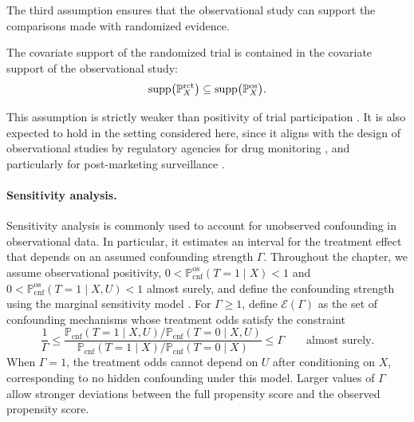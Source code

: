 The third assumption ensures that the observational study can support the comparisons made with randomized evidence.

\begin{assumption}
\label{asm:confounding-support-inclusion}
The covariate support of the randomized trial is contained in the covariate support of the observational study:
\[
  \operatorname{supp}\bigl(\mathbb{P}^{\mathrm{rct}}_X\bigr)
  \subseteq
  \operatorname{supp}\bigl(\mathbb{P}^{\mathrm{os}}_X\bigr).
\]
\end{assumption}

This assumption is strictly weaker than positivity of trial participation \citep{stuart2011use,hartman2015sample,andrews2017weighting,nie2021covariate,colnet2022reweighting}. It is also expected to hold in the setting considered here, since it aligns with the design of observational studies by regulatory agencies for drug monitoring \citep{he2020clinical}, and particularly for post-marketing surveillance \citep{franklin2019evaluating,schurman2019framework}.

\paragraph{Sensitivity analysis.}
Sensitivity analysis is commonly used to account for unobserved confounding in observational data. In particular, it estimates an interval for the treatment effect that depends on an assumed confounding strength \(\Gamma\). Throughout the chapter, we assume observational positivity, \(0 < \mathbb{P}^{\mathrm{os}}_{\mathrm{cnf}}(T=1\mid X) < 1\) and \(0 < \mathbb{P}^{\mathrm{os}}_{\mathrm{cnf}}(T=1\mid X,U) < 1\) almost surely, and define the confounding strength using the marginal sensitivity model \citep{tan2006distributional}. For \(\Gamma \geq 1\), define \(\mathcal{E}(\Gamma)\) as the set of confounding mechanisms whose treatment odds satisfy the constraint
\[
  \frac{1}{\Gamma}
  \leq
  \frac{
    \mathbb{P}_{\mathrm{cnf}}(T=1\mid X,U)/
    \mathbb{P}_{\mathrm{cnf}}(T=0\mid X,U)
  }{
    \mathbb{P}_{\mathrm{cnf}}(T=1\mid X)/
    \mathbb{P}_{\mathrm{cnf}}(T=0\mid X)
  }
  \leq
  \Gamma
  \qquad\text{almost surely.}
\]
When \(\Gamma=1\), the treatment odds cannot depend on \(U\) after conditioning on \(X\), corresponding to no hidden confounding under this model. Larger values of \(\Gamma\) allow stronger deviations between the full propensity score and the observed propensity score.

